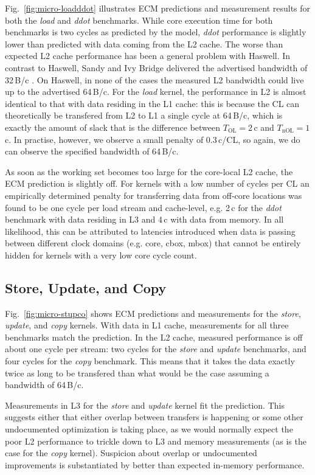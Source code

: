 \documentclass{llncs}
\begin{document}
Fig.~\ref{fig:micro-loadddot} illustrates ECM predictions and measurement
results for both the \textit{load} and \textit{ddot} benchmarks. While core
execution time for both benchmarks is two cycles as predicted by the model,
\textit{ddot} performance is slightly lower than predicted with data coming
from the L2 cache. The worse than expected L2 cache performance has been a
general problem with Haswell. In contrast to Haswell, Sandy and Ivy Bridge
delivered the advertised bandwidth of 32\,B/c \cite{sthw15}. On Haswell, in
none of the cases the measured L2 bandwidth could live up to the advertised
64\,B/c.  For the \textit{load} kernel, the performance in L2 is almost
identical to that with data residing in the L1 cache: this is because the CL
can theoretically be transfered from L2 to L1 a single cycle at 64\,B/c, which
is exactly the amount of slack that is the difference between
$T_\mathrm{OL}=2$\,c and $T_\mathrm{nOL}=1$\,c. In practise, however, we
observe a small penalty of 0.3\,c/CL, so again, we do can observe the specified
bandwidth of 64\,B/c.

As soon as the working set becomes too large for the core-local L2 cache, the
ECM prediction is slightly off. For kernels with a low number of cycles per CL
an empirically determined penalty for transferring data from off-core locations
was found to be one cycle per load stream and cache-level, e.g.  2\,c for the
\textit{ddot} benchmark with data residing in L3 and 4\,c with data from
memory. In all likelihood, this can be attributed to latencies introduced when
data is passing between different clock domains (e.g. core, cbox, mbox) that
cannot be entirely hidden for kernels with a very low core cycle count.

\subsection{Store, Update, and Copy}

Fig.~\ref{fig:micro-stupco} shows ECM predictions and measurements for the
\textit{store}, \textit{update}, and \textit{copy} kernels. With data in L1
cache, measurements for all three benchmarks match the prediction. In the L2
cache, measured performance is off about one cycle per stream: two cycles for
the \textit{store} and \textit{update} benchmarks, and four cycles for the
\textit{copy} benchmark. This means that it takes the data exactly twice as
long to be transfered than what would be the case assuming a bandwidth of
64\,B/c.

Measurements in L3 for the \textit{store} and \textit{update} kernel fit the
prediction. This suggests either that either overlap between transfers is
happening or some other undocumented optimization is taking place, as we would
normally expect the poor L2 performance to trickle down to L3 and memory
measurements (as is the case for the \textit{copy} kernel). Suspicion about
overlap or undocumented improvements is substantiated by better than expected
in-memory performance.
\end{document}
